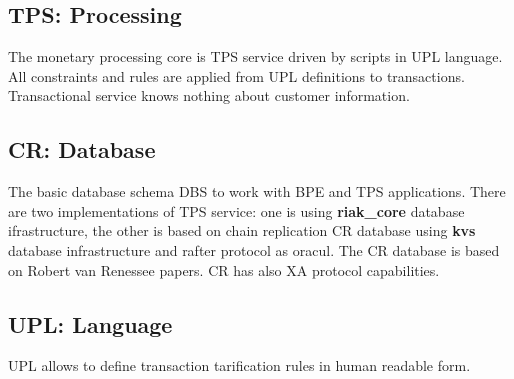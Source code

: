 \subsection{TPS: Processing}
The monetary processing core is TPS service driven by scripts in UPL language.
All constraints and rules are applied from UPL definitions to transactions.
Transactional service knows nothing about customer information.

\subsection{CR: Database}
The basic database schema DBS to work with BPE and TPS applications.
There are two implementations of TPS service: one is using {\bf riak\_core}
database ifrastructure, the other is based on chain replication CR database
using {\bf kvs} database infrastructure and rafter protocol as oracul.
The CR database is based on Robert van Renessee papers. CR has also
XA protocol capabilities.

\subsection{UPL: Language}
UPL allows to define transaction tarification rules in human readable form.
